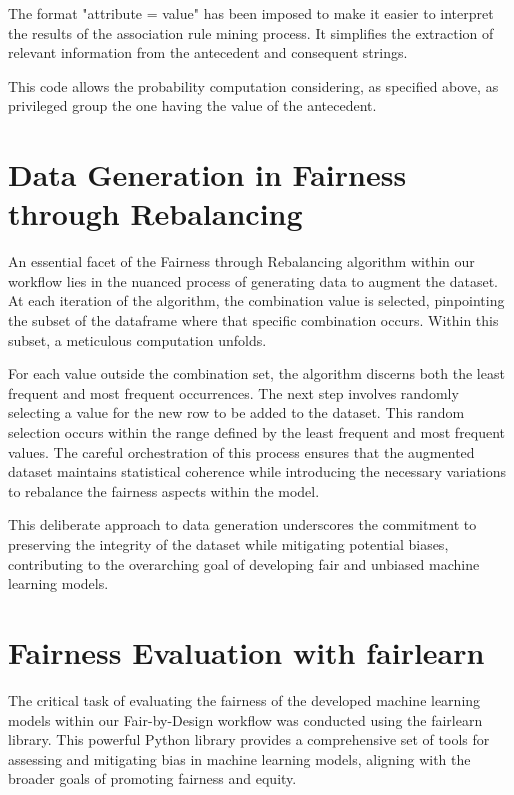 The format "attribute = value" has been imposed to make it easier to interpret the results of the association rule mining process. It simplifies the extraction of relevant information from the antecedent and consequent strings.



This code allows the probability computation considering, as specified above, as privileged group the one having the value of the antecedent.

\section{Data Generation in Fairness through Rebalancing}

An essential facet of the Fairness through Rebalancing algorithm within our workflow lies in the nuanced process of generating data to augment the dataset. At each iteration of the algorithm, the combination value is selected, pinpointing the subset of the dataframe where that specific combination occurs. Within this subset, a meticulous computation unfolds.



For each value outside the combination set, the algorithm discerns both the least frequent and most frequent occurrences. The next step involves randomly selecting a value for the new row to be added to the dataset. This random selection occurs within the range defined by the least frequent and most frequent values. The careful orchestration of this process ensures that the augmented dataset maintains statistical coherence while introducing the necessary variations to rebalance the fairness aspects within the model.

This deliberate approach to data generation underscores the commitment to preserving the integrity of the dataset while mitigating potential biases, contributing to the overarching goal of developing fair and unbiased machine learning models.


\section{Fairness Evaluation with fairlearn}

The critical task of evaluating the fairness of the developed machine learning models within our Fair-by-Design workflow was conducted using the fairlearn library. This powerful Python library provides a comprehensive set of tools for assessing and mitigating bias in machine learning models, aligning with the broader goals of promoting fairness and equity.

